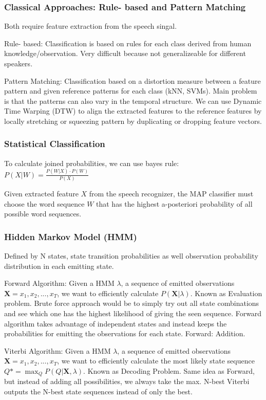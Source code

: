 \subsubsection{Classical Approaches: Rule- based and Pattern Matching}
Both require feature extraction from the speech singal.

Rule- based: Classification is based on rules for each class derived from human knowledge/observation.
Very difficult because not generalizeable for different speakers.

Pattern Matching: Classification based on a distortion measure between a feature pattern and given reference patterns for each class (kNN, SVMs).
Main problem is that the patterns can also vary in the temporal structure.
We can use Dynamic Time Warping (DTW) to align the extracted features to the reference features by
locally stretching or squeezing pattern by duplicating or dropping feature vectors.

\subsubsection{Statistical Classification}
To calculate joined probabilities, we can use bayes rule: $ P(X | W) = \frac{P(W | X) \cdot P(W)}{P(X)} $

Given extracted feature  $ X $ from the speech recognizer, the MAP classifier must choose the word sequence $ W $
that has the highest a-posteriori probability of all possible word sequences.

\subsubsection{Hidden Markov Model (HMM)}
Defined by N states, state transition probabilities as well observation probability distribution in each emitting state.

Forward Algorithm: Given a HMM $ \lambda $, a sequence of emitted observations $ \textbf{X} = x_1, x_2, ..., x_T $,
we want to efficiently calculate $ P(\textbf{X} | \lambda) $. Known as Evaluation problem.
Brute force approach would be to simply try out all state combinations and see which one has the highest likelihood of giving the seen sequence.
Forward algorithm takes advantage of independent states and instead keeps the probabilities for emitting the observations for each state. Forward: Addition.

Viterbi Algorithm: Given a HMM $ \lambda $, a sequence of emitted observations $ \textbf{X} = x_1, x_2, ..., x_T $,
we want to efficiently calculate the most likely state sequence $ Q* = \max_Q P(Q | \textbf{X}, \lambda) $.
Known as Decoding Problem. Same idea as Forward, but instead of adding all possibilities, we always take the max.
N-best Viterbi outputs the N-best state sequences instead of only the best.


